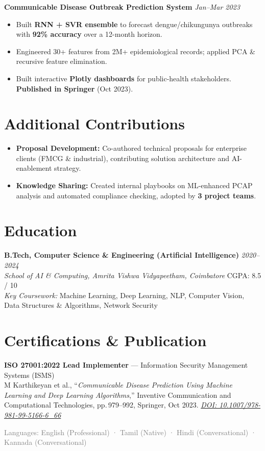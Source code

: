 \documentclass[10.5pt,a4paper]{article}
\begin{document}
\vspace{3pt}
\textbf{Communicable Disease Outbreak Prediction System} \hfill \textit{Jan–Mar 2023}
\begin{itemize}
  \item Built \textbf{RNN + SVR ensemble} to forecast dengue/chikungunya outbreaks with \textbf{92\% accuracy} over a 12-month horizon.
  \item Engineered 30+ features from 2M+ epidemiological records; applied PCA \& recursive feature elimination.
  \item Built interactive \textbf{Plotly dashboards} for public-health stakeholders. \textbf{Published in Springer} (Oct 2023).
\end{itemize}

\section{Additional Contributions}
\begin{itemize}
  \item \textbf{Proposal Development:} Co-authored technical proposals for enterprise clients (FMCG \& industrial), contributing solution architecture and AI-enablement strategy.
  \item \textbf{Knowledge Sharing:} Created internal playbooks on ML-enhanced PCAP analysis and automated compliance checking, adopted by \textbf{3 project teams}.
\end{itemize}

\section{Education}
\textbf{B.Tech, Computer Science \& Engineering (Artificial Intelligence)} \hfill \textit{2020–2024}\\
\textit{School of AI \& Computing, Amrita Vishwa Vidyapeetham, Coimbatore} \hfill CGPA: 8.5 / 10\\[2pt]
\textit{Key Coursework:} Machine Learning, Deep Learning, NLP, Computer Vision, Data Structures \& Algorithms, Network Security

\section{Certifications \& Publication}
\textbf{ISO 27001:2022 Lead Implementer} — Information Security Management Systems (ISMS)\\[4pt]
M Karthikeyan et al., ``\textit{Communicable Disease Prediction Using Machine Learning and Deep Learning Algorithms},'' Inventive Communication and Computational Technologies, pp.\,979–992, Springer, Oct 2023. \href{https://doi.org/10.1007/978-981-99-5166-6_66}{\textit{DOI: 10.1007/978-981-99-5166-6\_66}}

\vspace{6pt}
\begin{center}
\small\textcolor{gray}{Languages: English (Professional) · Tamil (Native) · Hindi (Conversational) · Kannada (Conversational)}
\end{center}
\end{document}
